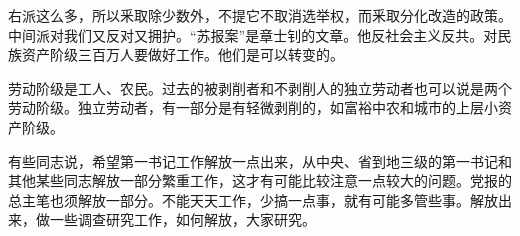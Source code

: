 右派这么多，所以釆取除少数外，不提它不取消选举权，而釆取分化改造的政策。中间派对我们又反对又拥护。“苏报案”是章士钊的文章。他反社会主义反共。对民族资产阶级三百万人要做好工作。他们是可以转变的。

劳动阶级是工人、农民。过去的被剥削者和不剥削人的独立劳动者也可以说是两个劳动阶级。独立劳动者，有一部分是有轻微剥削的，如富裕中农和城市的上层小资产阶级。

有些同志说，希望第一书记工作解放一点出来，从中央、省到地三级的第一书记和其他某些同志解放一部分繁重工作，这才有可能比较注意一点较大的问题。党报的总主笔也须解放一部分。不能天天工作，少搞一点事，就有可能多管些事。解放出来，做一些调查研究工作，如何解放，大家研究。

